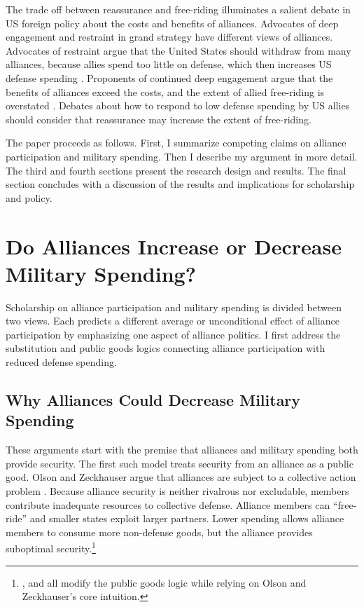 \documentclass[12pt]{article}
\begin{document}
The trade off between reassurance and free-riding illuminates a salient debate in US foreign policy about the costs and benefits of alliances. 
Advocates of deep engagement \citep{Brooksetal2013} and restraint \citep{Posen2014} in grand strategy have different views of alliances. 
Advocates of restraint argue that the United States should withdraw from many alliances, because allies spend too little on defense, which then increases US defense spending \citep{Preble2009}.
Proponents of continued deep engagement argue that the benefits of alliances exceed the costs, and the extent of allied free-riding is overstated \citep{BrandsFeaver2017}. 
Debates about how to respond to low defense spending by US allies should consider that reassurance may increase the extent of free-riding. 


The paper proceeds as follows. 
First, I summarize competing claims on alliance participation and military spending. 
Then I describe my argument in more detail. 
The third and fourth sections present the research design and results. 
The final section concludes with a discussion of the results and implications for scholarship and policy.  



\section{Do Alliances Increase or Decrease Military Spending?}


Scholarship on alliance participation and military spending is divided between two views.
Each predicts a different average or unconditional effect of alliance participation by emphasizing one aspect of alliance politics.  
I first address the substitution and public goods logics connecting alliance participation with reduced defense spending. 


\subsection{Why Alliances Could Decrease Military Spending} 


These arguments start with the premise that alliances and military spending both provide security.
The first such model treats security from an alliance as a public good. 
Olson and Zeckhauser argue that alliances are subject to a collective action problem \citep{OlsonZeckhauser1966}.
Because alliance security is neither rivalrous nor excludable, members contribute inadequate resources to collective defense. 
Alliance members can ``free-ride'' and smaller states exploit larger partners. 
Lower spending allows alliance members to consume more non-defense goods, but the alliance provides suboptimal security.\footnote{\citet{SandlerForbes1980}, \citet{Oneal1990} and \citet{SandlerHartley2001} all modify the public goods logic while relying on Olson and Zeckhauser's core intuition.} 
\end{document}
